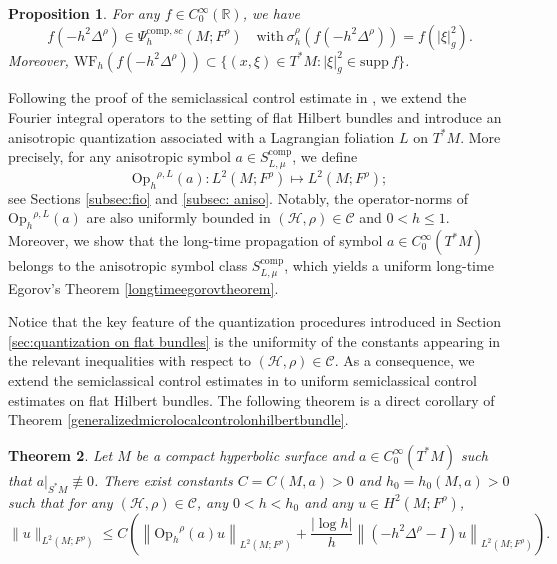 \documentclass[11pt,oneside,reqno]{amsart}
\newcommand\R{\ensuremath{\mathbb{R}}}
\newcommand\Oph{\ensuremath{\mathrm{Op}_h}}
\newtheorem{theorem}{Theorem}[section]
\newtheorem{proposition}[theorem]{Proposition}
\theoremstyle{definition}
\numberwithin{equation}{section}
\theoremstyle{plain}
\begin{document}
\begin{proposition}
    \label{functionalcalculus}
For any $f\in C_{0}^{\infty}(\R)$, we have
\begin{equation}
f(-h^2\Delta^{\rho}) \in \Psi^{\mathrm{comp},sc}_{h}(M;F^\rho) \quad \mathrm{with} \  \sigma_{h}^{\rho}(f(-h^2\Delta^{\rho}))=f(|\xi|^2_g).
\end{equation}
Moreover, $\mathrm{WF}_{h}(f(-h^2 \Delta^\rho))\subset \{(x,\xi)\in T^*M: |\xi|_g^2\in \mathrm{supp}\,f\}$.
\end{proposition}



Following the proof of the semiclassical control estimate in \cite[Theorem 2]{dyatlov2018semiclassical}, we extend the Fourier integral operators to the setting of flat Hilbert bundles and introduce an anisotropic quantization associated with a Lagrangian foliation $L$ on $T^*M$. More precisely, for any anisotropic symbol $a \in S^{\mathrm{comp}}_{L,\mu}$, we define
\begin{equation*}
    \Oph^{\rho,L}(a): L^2(M;F^{\rho})\mapsto L^2(M;F^{\rho});
\end{equation*}
see Sections \ref{subsec:fio} and \ref{subsec: aniso}. Notably, the operator-norms of $\Oph^{\rho,L}(a)$ are also uniformly bounded in $(\mathcal{H},\rho)\in \mathcal{C}$ and $0<h\leq 1$. Moreover, we show that the long-time propagation of symbol $a\in C_{0}^{\infty}(T^*M)$ belongs to the anisotropic symbol class $S^{\mathrm{comp}}_{L,\mu}$, which yields a uniform long-time Egorov's Theorem \ref{longtimeegorovtheorem}.

Notice that the key feature of the quantization procedures introduced in Section \ref{sec:quantization on flat bundles} is the uniformity of the constants appearing in the relevant inequalities with respect to $(\mathcal{H},\rho)\in \mathcal{C}$. As a consequence, we extend the semiclassical control estimates in \cite{dyatlov2018semiclassical} to uniform semiclassical control estimates on flat Hilbert bundles. The following theorem is a direct corollary of Theorem \ref{generalizedmicrolocalcontrolonhilbertbundle}.


\begin{theorem}\label{microlocalcontrolonhilbertbundle}
Let $M$ be a compact hyperbolic surface and $a \in C_{0}^{\infty}(T^* M)$ such that $ a |_{S^* M} \not \equiv 0$. There exist constants $C=C(M,a)>0$ and $h_{0}  = h_0(M,a)>0$ such that for any $(\mathcal{H},\rho)\in \mathcal{C}$, any $0<h<h_{0}$ and any $u \in H^2(M;F^{\rho})$,
\begin{equation}\label{microlocalcontrolonhilbertbundleq}
\|u\|_{L^2(M;F^{\rho})} \leq C\left( \left\|\Oph^{\rho}(a) u\right\|_{L^2(M;F^{\rho})}+\frac{|\log h|}{h}\left\|\left(-h^2 \Delta^{\rho}-I\right) u\right\|_{L^2(M;F^{\rho})} \right).
\end{equation}
\end{theorem}
\end{document}
